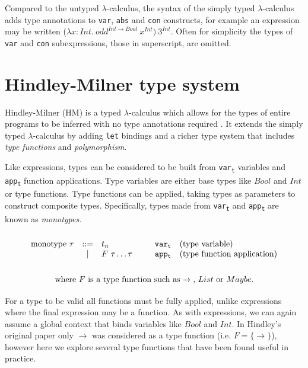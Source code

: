 \documentclass[a4paper,fleqn,oneside,12pt]{report}
\begin{document}
Compared to the untyped $\lambda$-calculus, the syntax of the simply typed $\lambda$-calculus adds type annotations to \texttt{var}, \texttt{abs} and \texttt{con} constructs, for example an expression may be written ($\lambda x: Int.\ odd^{Int \rightarrow Bool}\ x^{Int})\ 3^{Int}$. Often for simplicity the types of \texttt{var} and \texttt{con} subexpressions, those in superscript, are omitted.

\section{Hindley-Milner type system}\label{id:h.gsouq2axz3k}

Hindley-Milner (HM) is a typed $\lambda$-calculus which allows for the types of entire programs to be inferred with no type annotations required \citep{ref12,ref13}. It extends the simply typed $\lambda$-calculus by adding \texttt{let} bindings and a richer type system that includes \textit{type functions} and \textit{polymorphism}.

Like expressions, types can be considered to be built from \texttt{var\textsubscript{t}} variables and \texttt{app\textsubscript{t}} function applications. Type variables are either base types like $Bool$ and $Int$ or type functions. Type functions can be applied, taking types as parameters to construct composite types. Specifically, types made from \texttt{var\textsubscript{t}} and \texttt{app\textsubscript{t}} are known as \textit{monotypes}.
$$\begin{array}{lcllll}
  \\
    \textrm{monotype}\ \tau & ::= & t_n               & \hspace{0.25cm} & \mathtt{var_t} & \textrm{(type variable)}\\
                          & \vert & F\ \tau \dots \tau &                 & \mathtt{app_t} & \textrm{(type function application)}\\
  \\
\end{array}
$$
\vspace{-0.8cm}
$$
\textrm{where }F\textrm{ is a type function such as}\rightarrow\textrm{, }List\textrm{ or }Maybe.\\
$$
\vspace{0cm} %

For a type to be valid all functions must be fully applied, unlike expressions where the final expression may be a function. As with expressions, we can again assume a global context that binds variables like $Bool$ and $Int$. In Hindley’s original paper only $\rightarrow$ was considered as a type function (i.e. $F = \{ \rightarrow \}$), however here we explore several type functions that have been found useful in practice.
\end{document}
